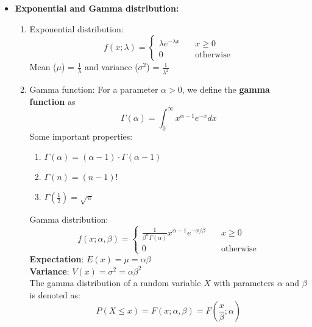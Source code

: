 \documentclass[a4paper]{article}
\begin{document}
\begin{itemize}
    \item \textbf{Exponential and Gamma distribution:}
    \begin{enumerate}
        \item Exponential distribution:
        \begin{equation*}
            f(x;\lambda) = \begin{cases}
            \lambda e^{-\lambda x}\quad & x\geq 0\\
            0\quad & \text{otherwise}
            \end{cases}
        \end{equation*}
        Mean ($\mu$) = $\frac{1}{\lambda}$ and variance ($\sigma^2$) = $\frac{1}{\lambda^2}$
        \item Gamma function: For a parameter $\alpha > 0$, we define the \textbf{gamma function} as
        \begin{equation*}
            \Gamma(\alpha) = \int_{0}^{\infty}x^{\alpha-1}e^{-x}dx
        \end{equation*}
        Some important properties:
        \begin{enumerate}
            \item $\Gamma(\alpha) = (\alpha-1)\cdot\Gamma(\alpha-1)$
            \item $\Gamma(n) = (n-1)!$
            \item $\Gamma(\frac{1}{2}) = \sqrt{\pi}$
        \end{enumerate}
        Gamma distribution:
        \begin{equation*}
            f(x; \alpha,\beta) = \begin{cases}
              \frac{1}{\beta^\alpha\Gamma(\alpha)}x^{\alpha-1}e^{-x/\beta}\quad & x\geq 0\\
              0 \quad &\text{otherwise}
            \end{cases}
        \end{equation*}
        \textbf{Expectation}: $E(x) = \mu = \alpha\beta$\\
        \textbf{Variance}: $V(x) = \sigma^2 = \alpha\beta^2$\\
        The gamma distribution of a random variable $X$ with parameters $\alpha$ and $\beta$ is denoted as:
        \begin{equation*}
            P(X\leq x) = F(x; \alpha,\beta) = F\left(\frac{x}{\beta}; \alpha\right)
        \end{equation*}
    

\end{enumerate}
\end{itemize}
\end{document}
